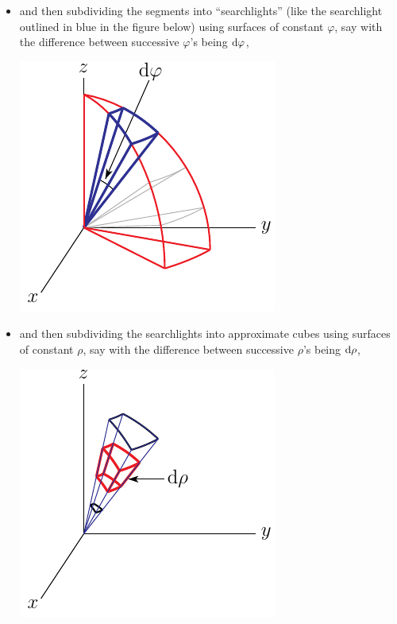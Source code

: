 \begin{itemize}
\item
and then subdividing the segments into ``searchlights'' (like the
searchlight outlined in blue in the figure below) using surfaces of 
constant $\varphi$, say with the difference between successive 
$\varphi$'s being $\mathrm{d}\varphi$,
\begin{efig}
\begin{center}
    \includegraphics[scale=0.9]{sphereSph2.pdf}
\end{center}
\end{efig}
\item
and then subdividing the searchlights into approximate cubes using surfaces 
of  constant $\rho$, say with the difference between successive $\rho$'s 
being $\mathrm{d}\rho$,
\begin{efig}
\begin{center}
    \includegraphics[scale=0.9]{sphereSph3.pdf}
\end{center}
\end{efig}
\end{itemize}
